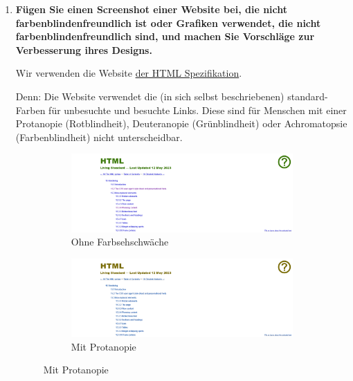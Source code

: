 \documentclass[a4paper,12pt]{article}
\begin{document}
\begin{enumerate}[label=\alph*)]
  \item \textbf{Fügen Sie einen Screenshot einer Website bei, die nicht farbenblindenfreundlich
          ist oder Grafiken verwendet, die nicht farbenblindenfreundlich sind, und machen
          Sie Vorschläge zur Verbesserung ihres Designs.}

        Wir verwenden die Website \href{https://html.spec.whatwg.org/multipage/rendering.html}{der HTML Spezifikation}.

        Denn: Die Website verwendet die (in sich selbst beschriebenen) standard-Farben
        für unbesuchte und besuchte Links. Diese sind für Menschen mit einer Protanopie (Rotblindheit),
        Deuteranopie (Grünblindheit) oder Achromatopsie (Farbenblindheit) nicht unterscheidbar.


        \begin{figure}[h]
          \centering
          \begin{subfigure}[b]{0.4\textwidth}
            \includegraphics[width=\textwidth]{./2023-05-14-screenshot-without-cvd.png}
            \caption{Ohne Farbsehschwäche}
            \label{fig:without-cvd}
          \end{subfigure}
          \begin{subfigure}[b]{0.4\textwidth}
            \includegraphics[width=\textwidth]{./2023-05-14-screenshot-with-cvd.png}
            \caption{Mit Protanopie}
            \label{fig:with-cvd}
          \end{subfigure}
        \end{figure}


\end{enumerate}
\end{document}
